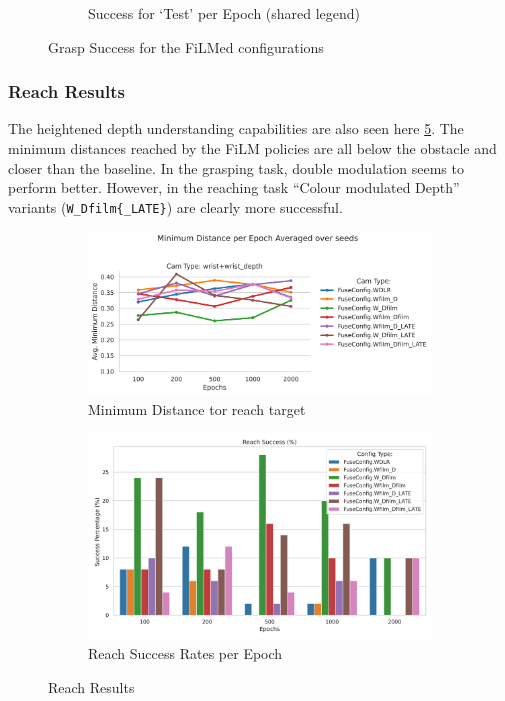 \begin{figure}[H]
\begin{subfigure}{0.30\linewidth}
    \caption{Success for `Test' per Epoch (shared legend)}\label{subfig:film-grasp-test-success-epoochs}
  \end{subfigure}
  
  \caption{Grasp Success for the FiLMed configurations}\label{fig:film-grasp-success}
\end{figure}


\subsubsection{Reach Results}
The heightened depth understanding capabilities are also seen here \ref{fig:film-reach}. The minimum distances reached by the FiLM policies are all below the obstacle and closer than the baseline. In the grasping task, double modulation seems to perform better. However, in the reaching task ``Colour modulated Depth'' variants (\verb|W_Dfilm{_LATE}|) are clearly more successful.

\begin{figure}[htpb]
  \centering
  \begin{subfigure}{0.40\linewidth}
    \centering
    \includegraphics[width=\linewidth]{assets/evaluation/film/reach-min-cams.png}
    \caption{Minimum Distance tor reach target}\label{subfig:film-reach-min}
  \end{subfigure}
  \begin{subfigure}{0.40\linewidth}
    \centering
    \includegraphics[width=\linewidth]{assets/evaluation/film/base-reach-success-config-epochs.png}
    \caption{Reach Success Rates per Epoch}\label{subfig:film-reach-success}
  \end{subfigure}
  \caption{Reach Results}\label{fig:film-reach}
\end{figure}

